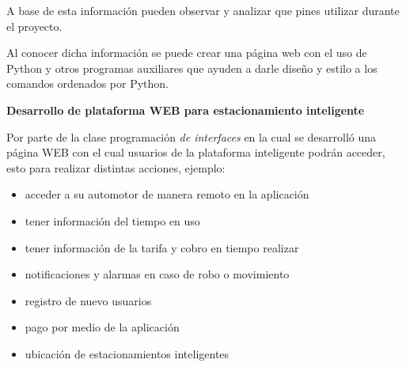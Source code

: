 \documentclass[12pt]{article}
\begin{document}
A base de esta información pueden observar y analizar que pines utilizar durante el proyecto.\par

Al conocer dicha información se puede crear una página web con el uso de Python y otros programas auxiliares que ayuden a darle diseño y estilo a los comandos ordenados por Python.\par


\vspace{\baselineskip}

\vspace{\baselineskip}

\vspace{\baselineskip}

\vspace{\baselineskip}

\vspace{\baselineskip}

\vspace{\baselineskip}

\vspace{\baselineskip}
\vspace{\baselineskip}
\newpage
\textbf{Desarrollo de plataforma WEB para estacionamiento inteligente}  \par


\vspace{\baselineskip}
Por parte de la clase programación\textit{ de interfaces }en la cual se desarrolló una página WEB con el cual usuarios de la plataforma inteligente podrán acceder, esto para realizar distintas acciones, ejemplo:\par


\vspace{\baselineskip}
\begin{itemize}
	\item acceder a su automotor de manera remoto en la aplicación\par

	\item tener información del tiempo en uso\par

	\item tener información de la tarifa y cobro en tiempo realizar\par

	\item notificaciones y alarmas en caso de robo o movimiento\par

	\item registro de nuevo usuarios\par

	\item pago por medio de la aplicación\par

	\item ubicación de estacionamientos inteligentes
\end{itemize}\par
\end{document}
